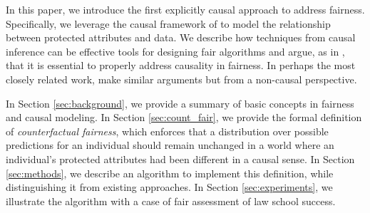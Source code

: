 % 

In this paper, we introduce the first explicitly causal 
approach to address fairness.
Specifically, we leverage the causal framework of
\citet{pearl2009causal} to model the relationship between protected
attributes and data. We describe how techniques from causal
inference can be effective tools for designing fair algorithms and
argue, as in \citet{dedeo2014wrong}, that it is essential to properly
address causality in fairness.
In perhaps the most closely related work, \citet{johnson2016impartial}
make similar arguments but from a non-causal perspective.

In Section \ref{sec:background}, we provide a summary of basic
concepts in fairness and causal modeling. In Section
\ref{sec:count_fair}, we provide the formal definition of
\emph{counterfactual fairness}, which enforces that a distribution
over possible predictions for an individual should remain unchanged
in a world where an individual's protected attributes had been
different in a causal sense. In Section \ref{sec:methods}, we describe an
algorithm to implement this definition, while distinguishing it from
existing approaches.  In Section \ref{sec:experiments}, we illustrate
the algorithm with a case of fair assessment of law school success.

